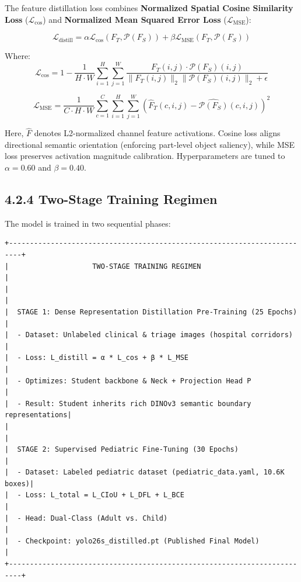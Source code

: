 The feature distillation loss combines \textbf{Normalized Spatial Cosine
Similarity Loss} (\(\mathcal{L}_{\text{cos}}\)) and \textbf{Normalized
Mean Squared Error Loss} (\(\mathcal{L}_{\text{MSE}}\)):

\[\mathcal{L}_{\text{distill}} = \alpha \mathcal{L}_{\text{cos}}(F_T, \mathcal{P}(F_S)) + \beta \mathcal{L}_{\text{MSE}}(F_T, \mathcal{P}(F_S))\]

Where:
\[\mathcal{L}_{\text{cos}} = 1 - \frac{1}{H \cdot W} \sum_{i=1}^H \sum_{j=1}^W \frac{F_T(i, j) \cdot \mathcal{P}(F_S)(i, j)}{\|F_T(i, j)\|_2 \|\mathcal{P}(F_S)(i, j)\|_2 + \epsilon}\]

\[\mathcal{L}_{\text{MSE}} = \frac{1}{C \cdot H \cdot W} \sum_{c=1}^C \sum_{i=1}^H \sum_{j=1}^W \left( \hat{F}_T(c, i, j) - \widehat{\mathcal{P}(F_S)}(c, i, j) \right)^2\]

Here, \(\hat{F}\) denotes L2-normalized channel feature activations.
Cosine loss aligns directional semantic orientation (enforcing
part-level object saliency), while MSE loss preserves activation
magnitude calibration. Hyperparameters are tuned to \(\alpha = 0.60\)
and \(\beta = 0.40\).

\subsection{4.2.4 Two-Stage Training
Regimen}\label{two-stage-training-regimen}

The model is trained in two sequential phases:

\begin{verbatim}
+-------------------------------------------------------------------------+
|                    TWO-STAGE TRAINING REGIMEN                           |
|                                                                         |
|  STAGE 1: Dense Representation Distillation Pre-Training (25 Epochs)    |
|  - Dataset: Unlabeled clinical & triage images (hospital corridors)     |
|  - Loss: L_distill = α * L_cos + β * L_MSE                              |
|  - Optimizes: Student backbone & Neck + Projection Head P               |
|  - Result: Student inherits rich DINOv3 semantic boundary representations|
|                                                                         |
|  STAGE 2: Supervised Pediatric Fine-Tuning (30 Epochs)                  |
|  - Dataset: Labeled pediatric dataset (pediatric_data.yaml, 10.6K boxes)|
|  - Loss: L_total = L_CIoU + L_DFL + L_BCE                               |
|  - Head: Dual-Class (Adult vs. Child)                                   |
|  - Checkpoint: yolo26s_distilled.pt (Published Final Model)             |
+-------------------------------------------------------------------------+
\end{verbatim}

